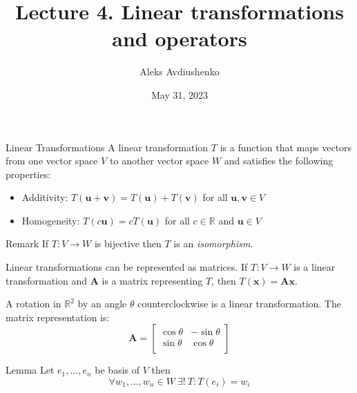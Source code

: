 \documentclass[fullscreen=true, bookmarks=true, hyperref={pdfencoding=unicode}]{beamer}
\title{Lecture 4. Linear transformations and operators}
\author{Aleks Avdiushenko}
\institute{Neapolis University Paphos}
\date{May 31, 2023}
\begin{document}

\begin{frame}
\transdissolve[duration=0.2]
\titlepage
\end{frame}

\begin{frame}{Linear Transformations}
A linear transformation $T$ is a function that maps vectors from one vector space $V$ to another vector space $W$ and satisfies the following properties:
\begin{itemize}
    \item Additivity: $T(\mathbf{u} + \mathbf{v}) = T(\mathbf{u}) + T(\mathbf{v})$ for all $\mathbf{u}, \mathbf{v} \in V$
    \item Homogeneity: $T(c\mathbf{u}) = cT(\mathbf{u})$ for all $c \in \mathbb{R}$ and $\mathbf{u} \in V$
\end{itemize}

\pause
\begin{block}{Remark}
  If $T: V \rightarrow W$ is bijective then $T$ is an \emph{isomorphism}.
\end{block}
\end{frame}


\begin{frame}
  Linear transformations can be represented as matrices. 
  If $T: V \rightarrow W$ is a linear transformation 
  and $\mathbf{A}$ is a matrix representing $T$, 
  then $T(\mathbf{x}) = \mathbf{A} \mathbf{x}$.

  \begin{example}
  A rotation in $\mathbb{R}^2$ by an angle $\theta$ counterclockwise is a linear transformation. The matrix representation is:
  \[
  \mathbf{A} = \begin{bmatrix}
  \cos\theta & -\sin\theta \\
  \sin\theta & \cos\theta \\
  \end{bmatrix}
  \]
  \end{example}

  \pause
  \begin{block}{Lemma}
    Let $e_1, \dots, e_n$ be basis of $V$ then 
    $$ \forall w_1, \dots, w_n \in W \ \exists !\ T: T(e_i) = w_i$$
  \end{block}

\end{frame}
\end{document}
